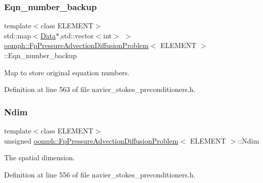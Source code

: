 \subsubsection{\texorpdfstring{Eqn\+\_\+number\+\_\+backup}{Eqn\_number\_backup}}
{\footnotesize\ttfamily template$<$class E\+L\+E\+M\+E\+NT$>$ \\
std\+::map$<$\hyperlink{classoomph_1_1Data}{Data}$\ast$,std\+::vector$<$int$>$ $>$ \hyperlink{classoomph_1_1FpPressureAdvectionDiffusionProblem}{oomph\+::\+Fp\+Pressure\+Advection\+Diffusion\+Problem}$<$ E\+L\+E\+M\+E\+NT $>$\+::Eqn\+\_\+number\+\_\+backup\hspace{0.3cm}{\ttfamily [private]}}



Map to store original equation numbers. 



Definition at line 563 of file navier\+\_\+stokes\+\_\+preconditioners.\+h.

\mbox{\label{classoomph_1_1FpPressureAdvectionDiffusionProblem_a026383763af2a00ca7c9052f10098375}} 
\subsubsection{\texorpdfstring{Ndim}{Ndim}}
{\footnotesize\ttfamily template$<$class E\+L\+E\+M\+E\+NT$>$ \\
unsigned \hyperlink{classoomph_1_1FpPressureAdvectionDiffusionProblem}{oomph\+::\+Fp\+Pressure\+Advection\+Diffusion\+Problem}$<$ E\+L\+E\+M\+E\+NT $>$\+::Ndim\hspace{0.3cm}{\ttfamily [private]}}



The spatial dimension. 



Definition at line 556 of file navier\+\_\+stokes\+\_\+preconditioners.\+h.

\mbox{\label{classoomph_1_1FpPressureAdvectionDiffusionProblem_aa39f26d35ad196059b7be871d77f04cc}} 
